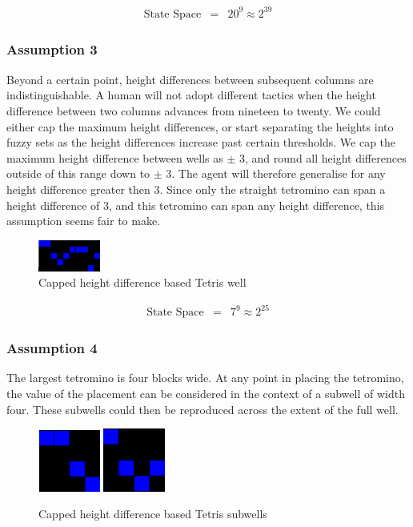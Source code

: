 \documentclass[a4paper,twocolumn]{article}
\begin{document}
\begin{eqnarray}
\textrm{State Space} & = & 20^{9} \approx 2^{39}
\end{eqnarray}

\subsubsection*{Assumption 3}

Beyond a certain point, height differences between subsequent columns are indistinguishable. A human will not adopt different tactics when the height difference between two columns advances from nineteen to twenty. We could either cap the maximum height differences, or start separating the heights into fuzzy sets as the height differences increase past certain thresholds. We cap the maximum height difference between wells as $\pm$ 3, and round all height differences outside of this range down to $\pm$ 3. The agent will therefore generalise for any height difference greater then 3. Since only the straight tetromino can span a height difference of 3, and this tetromino can span any height difference, this assumption seems fair to make. 

\begin{figure}[h]
\centering
\includegraphics[width=0.8in]{capdiffheightwell.png}
\caption{Capped height difference based Tetris well}
\label{fig:capdiffheightwell}
\end{figure}

\begin{eqnarray}
\textrm{State Space} & = & 7^{9} \approx 2^{25}
\end{eqnarray}

\subsubsection*{Assumption 4}

The largest tetromino is four blocks wide. At any point in placing the tetromino, the value of the placement can be considered in the context of a subwell of width four. These subwells could then be reproduced across the extent of the full well.

\begin{figure}[h]
\centering
\includegraphics[width=0.8in]{reducedwell.png}
\includegraphics[width=0.8in]{reducedwell2.png}
\caption{Capped height difference based Tetris subwells}
\label{fig:redwell}
\end{figure}
\end{document}
